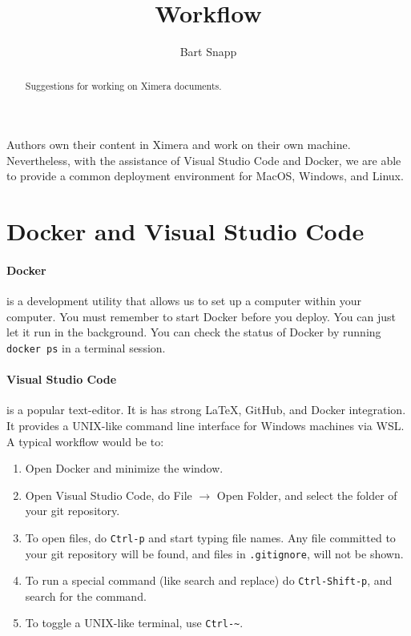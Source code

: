 \documentclass{ximera}
\title{Workflow}
\author{Bart Snapp}
\begin{document}
\begin{abstract}
      Suggestions for working on Ximera documents.
\end{abstract}
\maketitle

Authors own their content in Ximera and work on their own machine.
Nevertheless, with the assistance of Visual Studio Code and Docker, we are able
to provide a common deployment environment for MacOS, Windows, and Linux.

\section{Docker and Visual Studio Code}

\paragraph{Docker} is a development utility that allows us to set up a computer within your
computer. You must remember to start Docker before you deploy. You can just let
it run in the background. You can check the status of Docker by running
\verb!docker ps! in a terminal session.

\paragraph{Visual Studio Code}
is a popular text-editor. It is has strong \LaTeX, GitHub,
and Docker integration. It provides a UNIX-like command line interface for
Windows machines via WSL. A typical workflow would be to:
\begin{enumerate}
      \item Open Docker and minimize the window.
      \item Open Visual Studio Code, do File $\to$ Open Folder, and select the
            folder of your git repository.
      \item To open files, do \verb!Ctrl-p! and start typing file names. Any
            file
            committed to your git repository will be found, and files in
            \verb!.gitignore!, will not be shown.
      \item To run a special command (like search and replace) do
            \verb!Ctrl-Shift-p!, and search for the command.
      \item To toggle a UNIX-like terminal, use \verb!Ctrl-~!.
\end{enumerate}
\end{document}
